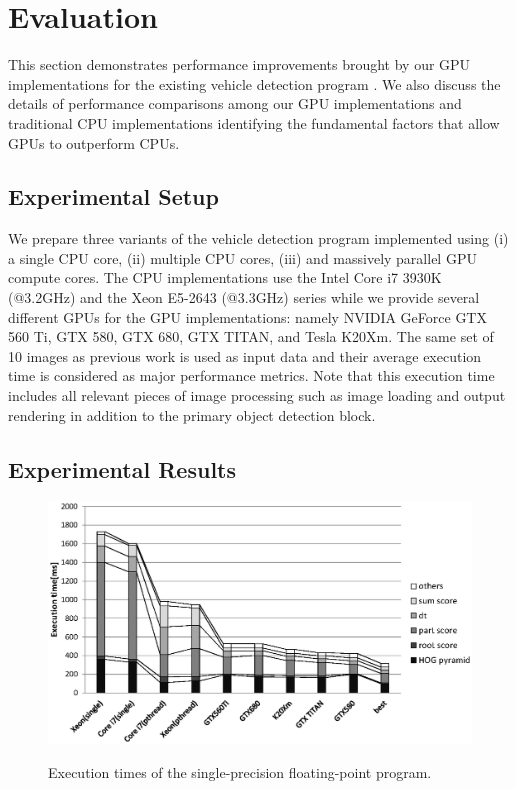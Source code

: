 \section{Evaluation}
\label{sec:evaluation}

This section demonstrates performance improvements brought by our GPU
implementations for the existing vehicle detection program
\cite{Niknejad12}.
We also discuss the details of performance comparisons among our GPU
implementations and traditional CPU implementations identifying the
fundamental factors that allow GPUs to outperform CPUs.

\subsection{Experimental Setup}
\label{sec:setup}

We prepare three variants of the vehicle detection program implemented
using (i) a single CPU core, (ii) multiple CPU cores, (iii) and
massively parallel GPU compute cores.
The CPU implementations use the Intel Core i7 3930K (@3.2GHz) and the
Xeon E5-2643 (@3.3GHz) series while we provide several different GPUs
for the GPU implementations: namely NVIDIA GeForce GTX 560 Ti, GTX 580,
GTX 680, GTX TITAN, and Tesla K20Xm.
The same set of 10 images as previous work \cite{Niknejad12} is used as
input data and their average execution time is considered as major
performance metrics.
Note that this execution time includes all relevant pieces of image
processing such as image loading and output rendering in addition to the
primary object detection block.

\subsection{Experimental Results}
\label{sec:results}

\begin{figure}[t]
 \begin{center}
  \includegraphics[width=\hsize]{fig/float_exe_time.eps}\\
  \caption{Execution times of the single-precision floating-point program.}
  \label{fig:float_exe_time}
 \end{center}
\end{figure}

